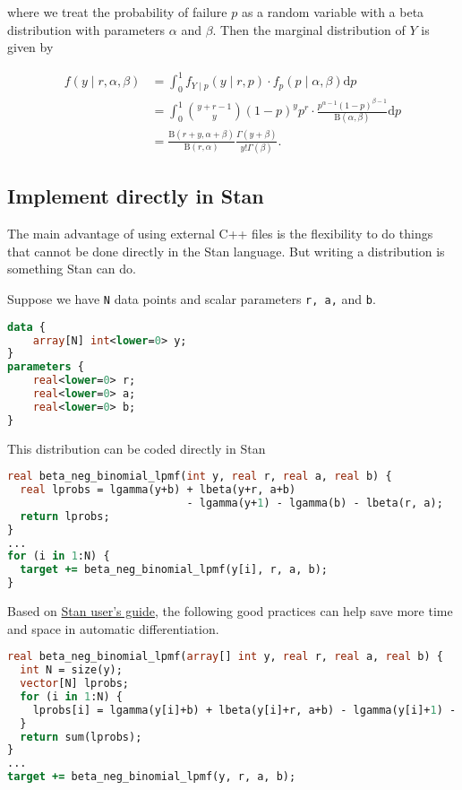 \documentclass[11pt]{article}
\begin{document}
where we treat the probability of failure $p$ as a random variable with a beta distribution with parameters $\alpha$ and $\beta$. Then the marginal distribution of $Y$ is given by

\begin{equation}
  \begin{aligned}
  f(y \mid r, \alpha ,\beta) &=\int_{0}^{1} f_{Y \mid p}(y \mid r,p) \cdot f_{p}(p \mid \alpha ,\beta )\mathrm {d} p \\
  &=\int_{0}^{1} {\binom {y+r-1}{y}} (1-p)^{y} p^{r} \cdot {\frac {p^{\alpha -1}(1-p)^{\beta -1}}{\mathrm{B} (\alpha ,\beta )}} \mathrm{d}p \\
  &= {\frac {\mathrm{B} (r+y,\alpha +\beta )}{\mathrm{B} (r,\alpha )}}{\frac {\Gamma (y+\beta )}{y! \Gamma (\beta )}}.
  \end{aligned}
\end{equation}





\subsection{Implement directly in Stan}

The main advantage of using external C++ files is the flexibility to do things that cannot be done directly in the Stan language. But writing a distribution is something Stan can do.

Suppose we have \verb|N| data points and scalar parameters \verb|r, a,| and \verb|b|.
\begin{lstlisting}[language=Stan, style=lgeneral]
data {
	array[N] int<lower=0> y;
}
parameters {
	real<lower=0> r;
	real<lower=0> a;
	real<lower=0> b;
}
\end{lstlisting}


This distribution can be coded directly in Stan
\begin{lstlisting}[language=Stan, style=lgeneral]
real beta_neg_binomial_lpmf(int y, real r, real a, real b) {
  real lprobs = lgamma(y+b) + lbeta(y+r, a+b)
  							- lgamma(y+1) - lgamma(b) - lbeta(r, a);
  return lprobs;
}
...
for (i in 1:N) {
  target += beta_neg_binomial_lpmf(y[i], r, a, b);
}
\end{lstlisting}
Based on \href{https://mc-stan.org/docs/stan-users-guide/vectorization.html}{Stan user's guide}, the following good practices can help save more time and space in automatic differentiation.
\begin{lstlisting}[language=Stan, style=lgeneral]
real beta_neg_binomial_lpmf(array[] int y, real r, real a, real b) {
  int N = size(y);
  vector[N] lprobs;
  for (i in 1:N) {
    lprobs[i] = lgamma(y[i]+b) + lbeta(y[i]+r, a+b) - lgamma(y[i]+1) - lgamma(b) - lbeta(r, a);
  }
  return sum(lprobs);
}
...
target += beta_neg_binomial_lpmf(y, r, a, b);
\end{lstlisting}
\end{document}

